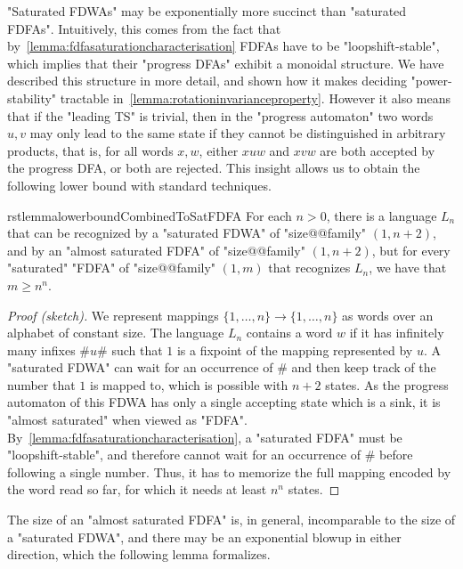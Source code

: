 \documentclass[a4paper,USenglish,cleveref,autoref,thm-restate]{lipics-v2021}
\begin{document}
"Saturated FDWAs" may be exponentially more succinct than "saturated FDFAs".
Intuitively, this comes from the fact that by~\cref{lemma:fdfasaturationcharacterisation} FDFAs have to be "loopshift-stable", which implies that their "progress DFAs" exhibit a monoidal structure.
We have described this structure in more detail, and shown how it makes deciding "power-stability" tractable in~\cref{lemma:rotationinvarianceproperty}.
However it also means that if the "leading TS" is trivial, then in the "progress automaton" two words $u,v$ may only lead to the same state if they cannot be distinguished in arbitrary products, that is, for all words $x,w$, either $xuw$ and $xvw$ are both accepted by the progress DFA, or both are rejected.
This insight allows us to obtain the following lower bound with standard techniques.

\begin{restatable}{rstlemma}{lowerboundCombinedToSatFDFA}
    For each $n > 0$, there is a language $L_n$ that can be recognized by a "saturated FDWA" of "size@@family" $(1,n+2)$, and by an "almost saturated FDFA" of "size@@family" $(1,n+2)$, but for every "saturated" "FDFA" of "size@@family" $(1,m)$ that recognizes $L_n$, we have that $m \geq n^n$.
  \label{lemma:lowerbound:combinedToSatFDFA}
\end{restatable}
\begin{proof}[Proof (sketch)]
    We represent mappings $\{1,\dotsc,n\}\rightarrow\{1,\dotsc,n\}$ as words over an alphabet of constant size.
    The language $L_n$ contains a word $w$ if it has infinitely many infixes $\#u\#$ such that $1$ is a fixpoint of the mapping represented by $u$.
    A "saturated FDWA" can wait for an occurrence of $\#$ and then keep track of the number that $1$ is mapped to, which is possible with $n+2$ states.
    As the progress automaton of this FDWA has only a single accepting state which is a sink, it is "almost saturated" when viewed as "FDFA".
    By~\cref{lemma:fdfasaturationcharacterisation}, a "saturated FDFA" must be "loopshift-stable", and therefore cannot wait for an occurrence of $\#$ before following a single number.
    Thus, it has to memorize the full mapping encoded by the word read so far, for which it needs at least $n^n$ states.
\end{proof}

The size of an "almost saturated FDFA" is, in general, incomparable to the size of a "saturated FDWA", and there may be an exponential blowup in either direction, which the following lemma formalizes.
\end{document}
